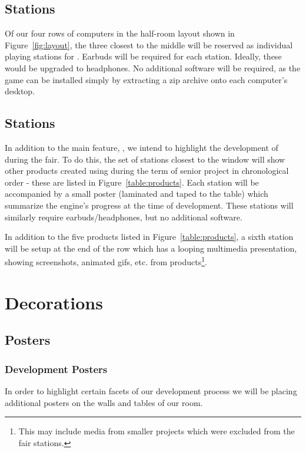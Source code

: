 \documentclass{GlobalDocument}
\begin{document}
\section{\ourgame{} Stations}
Of our four rows of computers in the half-room layout shown in Figure~\ref{fig:layout}, the three closest to the middle will be reserved as individual playing stations for \ourgame{}. Earbuds will be required for each station. Ideally, these would be upgraded to headphones. No additional software will be required, as the game can be installed simply by extracting a zip archive onto each computer's desktop.

\section{\ourengine{} Stations}
In addition to the main feature, \ourgame{}, we intend to highlight the development of \ourengine{} during the fair. To do this, the set of stations closest to the window will show other products created using \ourengine{} during the term of senior project in chronological order - these are listed in Figure~\ref{table:products}. Each station will be accompanied by a small poster (laminated and taped to the table) which summarize the engine's progress at the time of development. These stations will similarly require earbuds/headphones, but no additional software.

In addition to the five products listed in Figure~\ref{table:products}, a sixth station will be setup at the end of the row which has a looping multimedia presentation, showing screenshots, animated gifs, etc. from \ourengine{} products\footnote{This may include media from smaller projects which were excluded from the fair stations.}.

\chapter{Decorations}

\section{Posters}
\subsection{Development Posters}
In order to highlight certain facets of our development process we will be placing additional posters on the walls and tables of our room.
\end{document}
